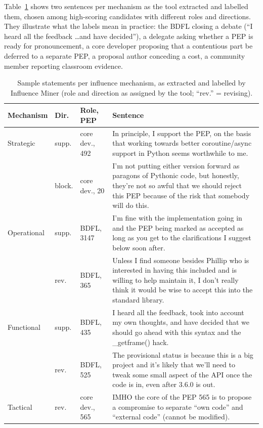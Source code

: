 \documentclass[sigconf,screen]{acmart}
\begin{document}
Table~\ref{tab:samples} shows two sentences per mechanism as the tool extracted and labelled them, chosen among high-scoring candidates with different roles and directions. They illustrate what the labels mean in practice: the BDFL closing a debate (``I heard all the feedback \ldots and have decided''), a delegate asking whether a PEP is ready for pronouncement, a core developer proposing that a contentious part be deferred to a separate PEP, a proposal author conceding a cost, a community member reporting classroom evidence.

\begin{table}
\caption{Sample statements per influence mechanism, as extracted and labelled by Influence Miner (role and direction as assigned by the tool; ``rev.'' = revising).}
\label{tab:samples}
\small
\begin{tabular}{p{}p{}p{}p{}}
\toprule
\textbf{Mechanism} & \textbf{Dir.} & \textbf{Role, PEP} & \textbf{Sentence} \\
\midrule
Strategic & supp. & core dev., 492 & In principle, I support the PEP, on the basis that working towards better coroutine/async support in Python seems worthwhile to me. \\
 & block. & core dev., 20 & I'm not putting either version forward as paragons of Pythonic code, but honestly, they're not so awful that we should reject this PEP because of the risk that somebody will do this. \\
\midrule
Operational & supp. & BDFL, 3147 & I'm fine with the implementation going in and the PEP being marked as accepted as long as you get to the clarifications I suggest below soon after. \\
 & rev. & BDFL, 365 & Unless I find someone besides Phillip who is interested in having this included and is willing to help maintain it, I don't really think it would be wise to accept this into the standard library. \\
\midrule
Functional & supp. & BDFL, 435 & I heard all the feedback, took into account my own thoughts, and have decided that we should go ahead with this syntax and the \_getframe() hack. \\
 & rev. & BDFL, 525 & The provisional status is because this is a big project and it's likely that we'll need to tweak some small aspect of the API once the code is in, even after 3.6.0 is out. \\
\midrule
Tactical & rev. & core dev., 565 & IMHO the core of the PEP 565 is to propose a compromise to separate ``own code'' and ``external code'' (cannot be modified). \\

\end{tabular}
\end{table}
\end{document}
